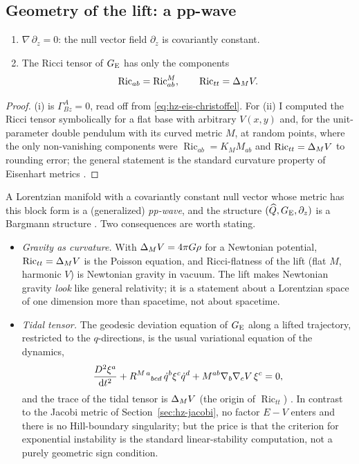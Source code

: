 \subsection{Geometry of the lift: a pp-wave}

\begin{proposition}\label{prop:hz-eis-curv}
\leavevmode
\begin{enumerate}[label=(\roman*),nosep]
  \item $\nabla\,\partial_z=0$: the null vector field $\partial_z$ is covariantly constant.
  \item The Ricci tensor of $G_{\rm E}$ has only the components
        \[
          \operatorname{Ric}_{ab}=\operatorname{Ric}^{M}_{ab},\qquad
          \operatorname{Ric}_{tt}=\Delta_MV .
        \]
\end{enumerate}
\end{proposition}

\begin{proof}
(i) is $\Gamma^A_{Bz}=0$, read off from \eqref{eq:hz-eis-christoffel}. For (ii) I computed the Ricci
tensor symbolically for a flat base with arbitrary $V(x,y)$ and, for the
unit-parameter double pendulum with its curved metric $M$, at random points, where the
only non-vanishing components were $\operatorname{Ric}_{ab}=K_MM_{ab}$ and
$\operatorname{Ric}_{tt}=\Delta_MV$ to rounding error; the general statement is the standard curvature
property of Eisenhart metrics \cite{hdp:casetti2000}.
\end{proof}

A Lorentzian manifold with a covariantly constant null vector whose metric has this
block form is a (generalized) \emph{pp-wave}, and the structure
$(\widehat Q,G_{\rm E},\partial_z)$ is a Bargmann structure \cite{hdp:duval1985,hdp:duval1991}.
Two consequences are worth stating.
\begin{itemize}[nosep]
  \item \emph{Gravity as curvature.} With $\Delta_MV=4\pi G\rho$ for a Newtonian
        potential, $\operatorname{Ric}_{tt}=\Delta_MV$ is the Poisson equation, and Ricci-flatness of the lift
        (flat $M$, harmonic $V$) is Newtonian gravity in vacuum. The lift makes Newtonian
        gravity \emph{look} like general relativity; it is a statement about a Lorentzian
        space of one dimension more than spacetime, not about spacetime.
  \item \emph{Tidal tensor.} The geodesic deviation equation of $G_{\rm E}$ along a lifted
        trajectory, restricted to the $q$-directions, is the usual variational equation of the
        dynamics,
        \[
          \frac{D^2\xi^a}{\mathrm{d} t^2}+R^{M\,a}{}_{bcd}\,\dot q^b\xi^c\dot q^d
          +M^{ab}\nabla_b\nabla_cV\,\xi^c=0,
        \]
        and the trace of the tidal tensor is $\Delta_MV$ (the origin of $\operatorname{Ric}_{tt}$)
        \cite{hdp:casetti2000}. In contrast to the Jacobi metric of
        Section~\ref{sec:hz-jacobi}, no factor $E-V$ enters and there is no Hill-boundary singularity;
        but the price is that the criterion for exponential instability is the standard
        linear-stability computation, not a purely geometric sign condition.
\end{itemize}


